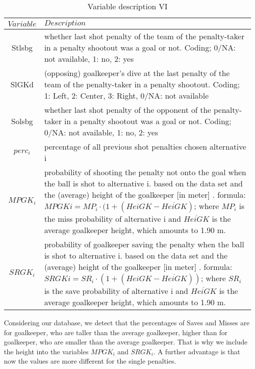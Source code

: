 \documentclass[12pt,dvipsnames]{article}%
\begin{document}
\begin{table}[h]
\caption{Variable description \small{VI}}
\begin{tabular}{ c | p{12cm}  }
    $Variable$ & $Description$   \\
   \hline

Stlsbg & whether last shot penalty of the team of the penalty-taker in a penalty shootout was a goal or not. Coding; 0/NA: not available, 1: no, 2: yes \\

SlGKd & (opposing) goalkeeper's dive at the last penalty of the team of the penalty-taker in a penalty shootout. Coding; 1: Left, 2: Center, 3: Right, 0/NA: not available \\

Solsbg & whether last shot penalty of the opponent of the penalty-taker in a penalty shootout was a goal or not. Coding; 0/NA: not available, 1: no, 2: yes \\

$perc_i$ & percentage of all previous shot penalties chosen alternative i \\

$MPGK_i$ & probability of shooting the penalty not onto the goal when the ball is shot to alternative i. based on the data set and the (average) height of the goalkeeper [in meter] \footnotemark[7]. formula: \linebreak $MPGKi = MP_i\cdot(1+(HeiGK-\overline{HeiGK})$;  where $MP_i$ is the miss probability of alternative i and $\overline{HeiGK}$ is the average goalkeeper height, which amounts to 1.90 m. \\

$SRGK_i$ & probability of goalkeeper saving the penalty when the ball is shot to alternative i. based on the data set and the (average) height of the goalkeeper [in meter] \footnotemark[7]. formula: 
$SRGKi = SR_i\cdot(1+(HeiGK-\overline{HeiGK}))$;
\linebreak where $SR_i$ is the save probability of alternative i and $\overline{HeiGK}$ is the average goalkeeper height, which amounts to 1.90 m.


 \end{tabular}

\footnotemark[7] Considering our database, we detect that the percentages of Saves and Misses are for goalkeeper, who are taller than the average goalkeeper, higher than for goalkeeper, who are smaller than the average goalkeeper. That is why we include the height into the variables $MPGK_i$ and $SRGK_i$. A further advantage is that now the values are more different for the single penalties. 
 
 \end{table}
 
\end{document}
